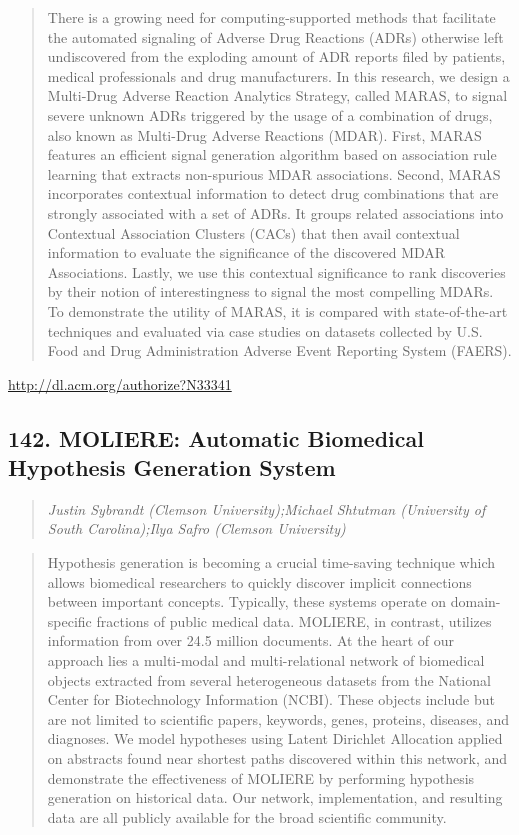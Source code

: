 \documentclass{article}
\begin{document}
\begin{quote}
There is a growing need for computing-supported methods that facilitate the automated signaling of Adverse Drug Reactions (ADRs) otherwise left undiscovered from the exploding amount of ADR reports filed by patients, medical professionals and drug manufacturers. In this research, we design a Multi-Drug Adverse Reaction Analytics Strategy, called MARAS, to signal severe unknown ADRs triggered by the usage of a combination of drugs, also known as Multi-Drug Adverse Reactions (MDAR). First, MARAS features an efficient signal generation algorithm based on association rule learning that extracts non-spurious MDAR associations. Second, MARAS incorporates contextual information to detect drug combinations that are strongly associated with a set of ADRs. It groups related associations into Contextual Association Clusters (CACs) that then avail contextual information to evaluate the significance of the discovered MDAR Associations. Lastly, we use this contextual significance to rank discoveries by their notion of interestingness to signal the most compelling MDARs. To demonstrate the utility of MARAS, it is compared with state-of-the-art techniques and evaluated via case studies on datasets collected by U.S. Food and Drug Administration Adverse Event Reporting System (FAERS).
\end{quote}

\href{http://dl.acm.org/authorize?N33341}{http://dl.acm.org/authorize?N33341}

\subsection{142. MOLIERE: Automatic Biomedical Hypothesis Generation System}

\begin{quote}
\footnotesize{\textit{Justin Sybrandt (Clemson University);Michael Shtutman (University of South Carolina);Ilya Safro (Clemson University)}}

\end{quote}

\begin{quote}
Hypothesis generation is becoming a crucial time-saving technique which allows biomedical researchers to quickly discover implicit connections between important concepts. Typically, these systems operate on domain-specific fractions of public medical data. MOLIERE, in contrast, utilizes information from over 24.5 million documents. At the heart of our approach lies a multi-modal and multi-relational network of biomedical objects extracted from several heterogeneous datasets from the National Center for Biotechnology Information (NCBI). These objects include but are not limited to scientific papers, keywords, genes, proteins, diseases, and diagnoses. We model hypotheses using Latent Dirichlet Allocation applied on abstracts found near shortest paths discovered within this network, and demonstrate the effectiveness of MOLIERE by performing hypothesis generation on historical data. Our network, implementation, and resulting data are all publicly available for the broad scientific community.
\end{quote}
\end{document}
